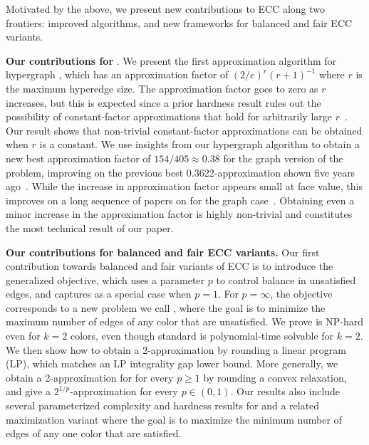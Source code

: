 Motivated by the above, we present new contributions to ECC along two frontiers: improved  \maxecc{} algorithms, and new frameworks for balanced and fair ECC variants.


\textbf{Our contributions for \maxecc{}}.
We present the first approximation algorithm for hypergraph \maxecc{}, which has an approximation factor of
$(2/e)^r(r+1)^{-1}$
where $r$ is the maximum hyperedge size. The approximation factor goes to zero as $r$ increases, but this is expected since a prior hardness result rules out the possibility of constant-factor approximations that hold for arbitrarily large $r$~\cite{veldt2023optimal}. Our result shows that non-trivial constant-factor approximations can be obtained when $r$ is a constant. We use insights from our hypergraph algorithm to obtain a new best approximation factor of $154/405 \approx 0.38$ for the graph version of the problem, improving on the previous best 0.3622-approximation shown five years ago~\cite{ageev20200}. While the increase in approximation factor appears small at face value, this improves on a long sequence of papers on \maxecc{} for the graph case~\cite{angel2016clustering,ageev2015improved,alhamdan2019approximability,ageev20200}. Obtaining even a minor increase in the approximation factor is highly non-trivial and constitutes the most technical result of our paper.

\textbf{Our contributions for balanced and fair ECC variants.}
Our first contribution towards balanced and fair variants of ECC is to introduce the generalized \pmeanECC{} objective, which uses a parameter $p$ to control balance in unsatisfied edges, and captures \minecc{} as a special case when $p = 1$. For $p = \infty$, the objective corresponds to a new problem we call \cfminECC{}, where the goal is to minimize the maximum number of edges of any color that are unsatisfied. We prove \cfminECC{} is NP-hard even for $k = 2$ colors, even though standard \minecc{} is polynomial-time solvable for $k = 2$. We then show how to obtain a 2-approximation by rounding a linear program (LP), which matches an LP integrality gap lower bound. More generally, we obtain a 2-approximation for \pmeanECC{} for every $p \geq 1$ by rounding a convex relaxation, and give a $2^{1/p}$-approximation for every $p \in (0,1)$. Our results also include several parameterized complexity and hardness results for \cfminECC{} and a related maximization variant where the goal is to maximize the minimum number of edges of any one color that are satisfied.

